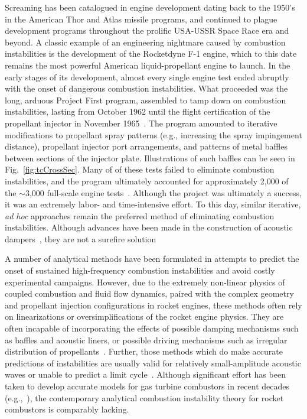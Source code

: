 Screaming has been catalogued in engine development dating back to the 1950's in the American Thor and Atlas missile programs, and continued to plague development programs throughout the prolific USA-USSR Space Race era and beyond. A classic example of an engineering nightmare caused by combustion instabilities is the development of the Rocketdyne F-1 engine, which to this date remains the most powerful American liquid-propellant engine to launch. In the early stages of its development, almost every single engine test ended abruptly with the onset of dangerous combustion instabilities. What proceeded was the long, arduous Project First program, assembled to tamp down on combustion instabilities, lasting from October 1962 until the flight certification of the propellant injector in November 1965~\cite{Young2008}. The program amounted to iterative modifications to propellant spray patterns (e.g., increasing the spray impingement distance), propellant injector port arrangements, and patterns of metal baffles between sections of the injector plate. Illustrations of such baffles can be seen in Fig.~\ref{fig:tcCrossSec}. Many of of these tests failed to eliminate combustion instabilities, and the program ultimately accounted for approximately 2,000 of the $\sim$3,000 full-scale engine tests~\cite{Oefelein1993}. Although the project was ultimately a success, it was an extremely labor- and time-intensive effort. To this day, similar iterative, \textit{ad hoc} approaches remain the preferred method of eliminating combustion instabilities. Although advances have been made in the construction of acoustic dampers~\cite{Zhao2015}, they are not a surefire solution

A number of analytical methods have been formulated in attempts to predict the onset of sustained high-frequency combustion instabilities and avoid costly experimental campaigns. However, due to the extremely non-linear physics of coupled combustion and fluid flow dynamics, paired with the complex geometry and propellant injection configurations in rocket engines, these methods often rely on linearizations or oversimplifications of the rocket engine physics. They are often incapable of incorporating the effects of possible damping mechanisms such as baffles and acoustic liners, or possible driving mechanisms such as irregular distribution of propellants~\cite{Yang1995}. Further, those methods which do make accurate predictions of instabilities are usually valid for relatively small-amplitude acoustic waves or unable to predict a limit cycle~\cite{Culick1994}. Although significant effort has been taken to develop accurate models for gas turbine combustors in recent decades (e.g.,~\cite{Noiray2008}), the contemporary analytical combustion instability theory for rocket combustors is comparably lacking.

